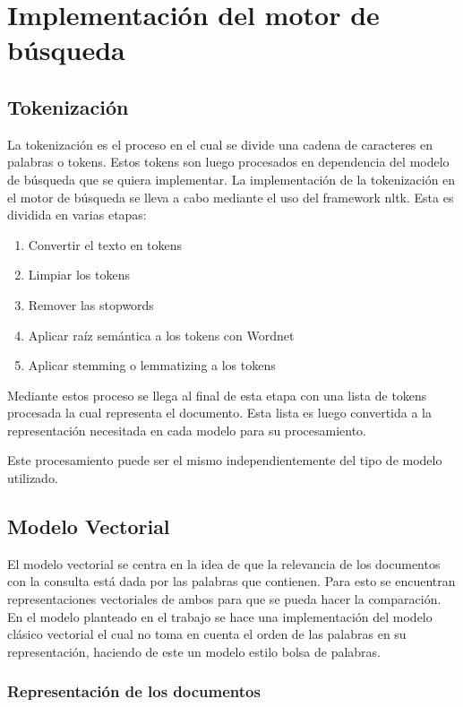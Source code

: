 \documentclass[runningheads]{llncs}
\begin{document}
\section{Implementación del motor de búsqueda}

\subsection{Tokenización}

La tokenización es el proceso en el cual se divide una cadena de caracteres en palabras o tokens.
Estos tokens son luego procesados en dependencia del modelo de búsqueda que se quiera implementar.
La implementación de la tokenización en el motor de búsqueda se lleva a cabo mediante el uso del
framework nltk. Esta es dividida en varias etapas:

\begin{enumerate}
    \item Convertir el texto en tokens
    \item Limpiar los tokens
    \item Remover las stopwords
    \item Aplicar raíz semántica a los tokens con Wordnet
    \item Aplicar stemming o lemmatizing a los tokens
\end{enumerate}

Mediante estos proceso se llega al final de esta etapa con una lista de tokens procesada la cual
representa el documento. Esta lista es luego convertida a la representación necesitada en cada modelo
para su procesamiento.

Este procesamiento puede ser el mismo independientemente del tipo de modelo utilizado.

\subsection{Modelo Vectorial}

El modelo vectorial se centra en la idea de que la relevancia de los documentos con la consulta está 
dada por las palabras que contienen. Para esto se encuentran representaciones vectoriales de ambos
para que se pueda hacer la comparación. En el modelo planteado en el trabajo se hace una implementación
del modelo clásico vectorial el cual no toma en cuenta el orden de las palabras en su representación, haciendo
de este un modelo estilo bolsa de palabras.

\subsubsection{Representación de los documentos}
\end{document}

